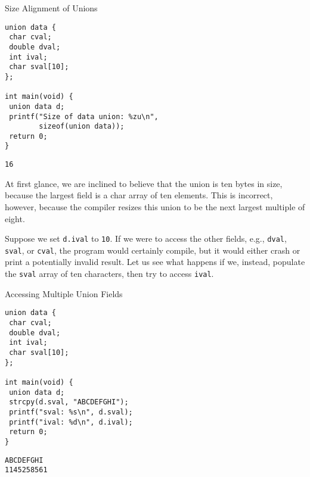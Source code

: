 \begin{cloast}[main.c]{Size Alignment of Unions}\begin{lstlisting}[language=MyC]
union data {
 char cval;
 double dval; 
 int ival; 
 char sval[10];
};

int main(void) {
 union data d;
 printf("Size of data union: %zu\n", 
        sizeof(union data));
 return 0;
}
\end{lstlisting}
\tcblower
\begin{lstlisting}[language=MyOutput]
16
\end{lstlisting}
\end{cloast}

At first glance, we are inclined to believe that the union is ten bytes in size, because the largest field is a char array of ten elements. This is incorrect, however, because the compiler resizes this union to be the next largest multiple of eight.

Suppose we set \texttt{d.ival} to \texttt{10}. If we were to access the other fields, e.g., \texttt{dval}, \texttt{sval}, or \texttt{cval}, the program would certainly compile, but it would either crash or print a potentially invalid result. Let us see what happens if we, instead, populate the \texttt{sval} array of ten characters, then try to access \texttt{ival}.

\begin{cloast}[main.c]{Accessing Multiple Union Fields}\begin{lstlisting}[language=MyC]
union data {
 char cval;
 double dval; 
 int ival; 
 char sval[10];
};

int main(void) {
 union data d;
 strcpy(d.sval, "ABCDEFGHI");
 printf("sval: %s\n", d.sval);
 printf("ival: %d\n", d.ival);
 return 0;
}
\end{lstlisting}
\tcblower
\begin{lstlisting}[language=MyOutput]
ABCDEFGHI
1145258561
\end{lstlisting}
\end{cloast}

